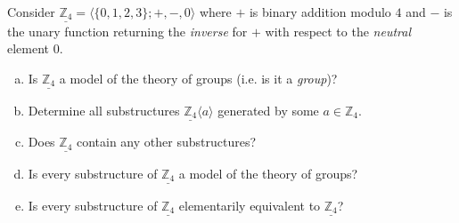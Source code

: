 \begin{problem}

    Consider $\underline{\mathbb Z_4}=\langle\{0,1,2,3\};+,-,0 \rangle$ where $+$ is binary addition modulo $4$ and $-$ is the unary function returning the \emph{inverse} for $+$ with respect to the \emph{neutral} element $0$.
    \begin{enumerate}[(a)]      
        \item Is $\underline{\mathbb Z_4}$ a model of the theory of groups (i.e. is it a \emph{group})?
        \item Determine all substructures $\underline{\mathbb Z_4}\langle a\rangle$ generated by some $a\in \mathbb Z_4$.
        \item Does $\underline{\mathbb Z_4}$ contain any other substructures?
        \item Is every substructure of $\underline{\mathbb Z_4}$ a model of the theory of groups?
        \item Is every substructure of $\underline{\mathbb Z_4}$ elementarily equivalent to $\underline{\mathbb Z_4}$?
    \end{enumerate}

    \begin{solution}


\end{solution}
\end{problem}
